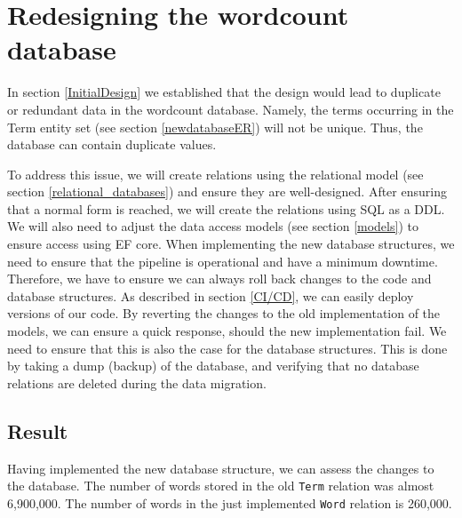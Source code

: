 \section{Redesigning the wordcount database}
In section \ref{InitialDesign} we established that the design would lead to duplicate or redundant data in the wordcount database.
Namely, the terms occurring in the Term entity set (see section \ref{newdatabaseER}) will not be unique. 
Thus, the database can contain duplicate values.
 
To address this issue, we will create relations using the relational model (see section \ref{relational_databases}) and ensure they are well-designed.
After ensuring that a normal form is reached, we will create the relations using SQL as a DDL.
We will also need to adjust the data access models (see section \ref{models}) to ensure access using EF core.
When implementing the new database structures, we need to ensure that the pipeline is operational and have a minimum downtime. 
Therefore, we have to ensure we can always roll back changes to the code and database structures.
As described in section \ref{CI/CD}, we can easily deploy versions of our code.
By reverting the changes to the old implementation of the models, we can ensure a quick response, should the new implementation fail.
We need to ensure that this is also the case for the database structures.
This is done by taking a dump (backup) of the database, and verifying that no database relations are deleted during the data migration.




\subsection{Result}
Having implemented the new database structure, we can assess the changes to the database. 
The number of words stored in the old \texttt{Term} relation was almost 6,900,000.
The number of words in the just implemented \texttt{Word} relation is 260,000.

